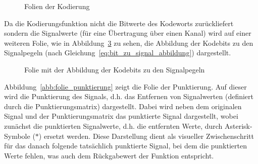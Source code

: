 \begin{figure}[th]
\begin{subfigure}{0.7\textwidth}
		\caption{}
		\label{abb:folie_kodierung_3}
	\end{subfigure}
	\caption{Folien der Kodierung}
	\label{abb:folie_kodierung}
\end{figure}
Da die Kodierungsfunktion nicht die Bitwerte des Kodeworts zurückliefert sondern die Signalwerte (für eine Übertragung über einen Kanal) wird auf einer weiteren Folie, wie in Abbildung~\ref{abb:folie_bit_zu_signal_abbildung} zu sehen, die Abbildung der Kodebits zu den Signalpegeln (nach Gleichung~\ref{eq:bit_zu_signal_abbildung}) dargestellt.
\begin{figure}[th]
	\centering
	\caption{Folie mit der Abbildung der Kodebits zu den Signalpegeln}
	\label{abb:folie_bit_zu_signal_abbildung}
\end{figure}
Abbildung~\ref{abb:folie_punktierung} zeigt die Folie der Punktierung. Auf dieser wird die Punktierung des Signals, d.h. das Entfernen von Signalwerten (definiert durch die Punktierungsmatrix) dargestellt. Dabei wird neben dem originalen Signal und der Punktierungsmatrix das punktierte Signal dargestellt, wobei zunächst die punktierten Signalwerte, d.h. die entfernten Werte, durch Asterisk-Symbole ($\ast$) ersetzt werden. Diese Darstellung dient als visueller Zwischenschritt für das danach folgende tatsächlich punktierte Signal, bei dem die punktierten Werte fehlen, was auch dem Rückgabewert der Funktion entspricht.
